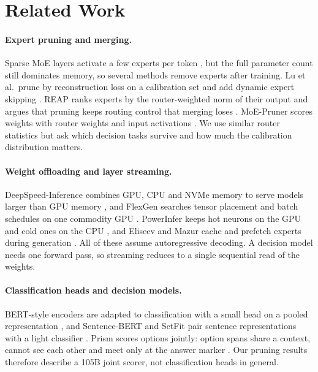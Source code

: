 \documentclass[11pt,a4paper]{article}
\begin{document}
\section{Related Work}

\paragraph{Expert pruning and merging.}
Sparse MoE layers activate a few experts per token \citep{shazeer2017outrageously,fedus2022switch,jiang2024mixtral}, but the full parameter count still dominates memory, so several methods remove experts after training. Lu et al.\ prune by reconstruction loss on a calibration set and add dynamic expert skipping \citep{lu2024experts}. REAP ranks experts by the router-weighted norm of their output and argues that pruning keeps routing control that merging loses \citep{lasby2026reap}. MoE-Pruner scores weights with router weights and input activations \citep{xie2024moepruner}. We use similar router statistics but ask which decision tasks survive and how much the calibration distribution matters.

\paragraph{Weight offloading and layer streaming.}
DeepSpeed-Inference combines GPU, CPU and NVMe memory to serve models larger than GPU memory \citep{aminabadi2022deepspeed}, and FlexGen searches tensor placement and batch schedules on one commodity GPU \citep{sheng2023flexgen}. PowerInfer keeps hot neurons on the GPU and cold ones on the CPU \citep{song2024powerinfer}, and Eliseev and Mazur cache and prefetch experts during generation \citep{eliseev2023offloading}. All of these assume autoregressive decoding. A decision model needs one forward pass, so streaming reduces to a single sequential read of the weights.

\paragraph{Classification heads and decision models.}
BERT-style encoders are adapted to classification with a small head on a pooled representation \citep{devlin2019bert}, and Sentence-BERT and SetFit pair sentence representations with a light classifier \citep{reimers2019sentence,tunstall2022setfit}. Prism scores options jointly: option spans share a context, cannot see each other and meet only at the answer marker \citep{sarvam2026prism}. Our pruning results therefore describe a 105B joint scorer, not classification heads in general.
\end{document}
